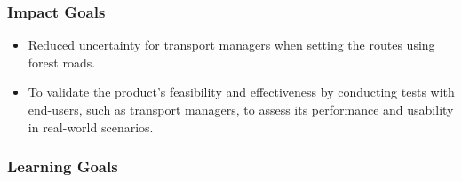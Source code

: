 \subsubsection{Impact Goals}
\begin{itemize}
    \item Reduced uncertainty for transport managers when setting the routes using forest roads.
    \item To validate the product's feasibility and effectiveness by conducting tests with end-users, such as transport managers, to assess its performance and usability in real-world scenarios.

\end{itemize}

\subsubsection{Learning Goals}

